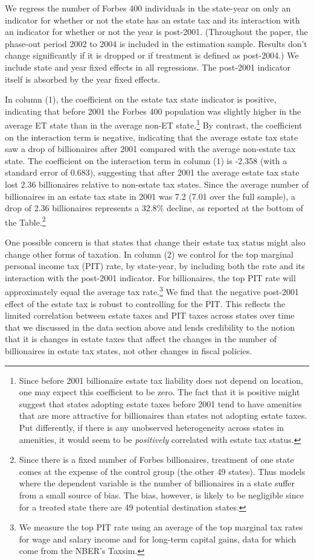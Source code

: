 \documentclass[12pt]{article}
\begin{document}
We regress the number of Forbes 400 individuals in the state-year on only an indicator for whether or not the state has an estate tax and its interaction with an indicator for whether or not the year is post-2001. (Throughout the paper, the phase-out period 2002 to 2004 is included in the estimation sample. Results don't change significantly if it is dropped or if treatment is defined as post-2004.) We include state and year fixed effects in all regressions. The post-2001 indicator itself is absorbed by the year fixed effects. 

In column (1), the coefficient on the estate tax state indicator is positive, indicating that before 2001 the Forbes 400 population was slightly higher in the average ET state than in the average non-ET state.\footnote{Since before 2001 billionaire estate tax liability does not depend on location,  one may expect this coefficient to be zero. 
The fact that it is positive might suggest that states adopting estate taxes before 2001 tend to have amenities that are more attractive for billionaires than states not adopting estate taxes. Put differently, if there is any unobserved heterogeneity across states in amenities, it would seem to be  {\it positively} correlated with estate tax status.} 
By contrast, the coefficient on the interaction term is negative, indicating that the average estate tax state saw a drop of  billionaires after 2001 compared with the average non-estate tax state. 
The coefficient on the interaction term in column (1) is -2.358 (with a standard error of 0.683), suggesting that after 2001 the average estate tax state lost 2.36  billionaires relative to non-estate tax states. 
Since the average number of billionaires in an estate tax state in 2001 was 7.2 (7.01 over the full sample), a drop of 2.36 billionaires represents a 32.8\% decline, as reported at the bottom of the Table.\footnote{Since there is a fixed number of Forbes billionaires, treatment of one state comes at the expense of the control group (the other 49 states). Thus models where the dependent variable is the number of billionaires in a state suffer from a small source of bias. The bias, however, is likely to be negligible since for a treated state there are 49 potential destination states.}

One possible concern is that states that change their estate tax status might also change other forms of taxation. In column (2) we control for the top marginal personal income tax (PIT) rate, by state-year, by including both the rate and its interaction with the post-2001 indicator. For billionaires, the top PIT rate will approximately equal the average tax rate.\footnote{We measure the top PIT rate using an average of the top marginal tax rates for wage and salary income and for long-term capital gains, data for which come from the NBER's Taxsim.} We find that the negative post-2001 effect of the estate tax is robust to controlling for the PIT. This  reflects the limited correlation between estate taxes and PIT taxes across states over time that we discussed in the data section above and lends credibility to the notion that it is changes in estate taxes that affect the changes in the number of billionaires in estate tax states, not other changes in fiscal policies. 
\end{document}
